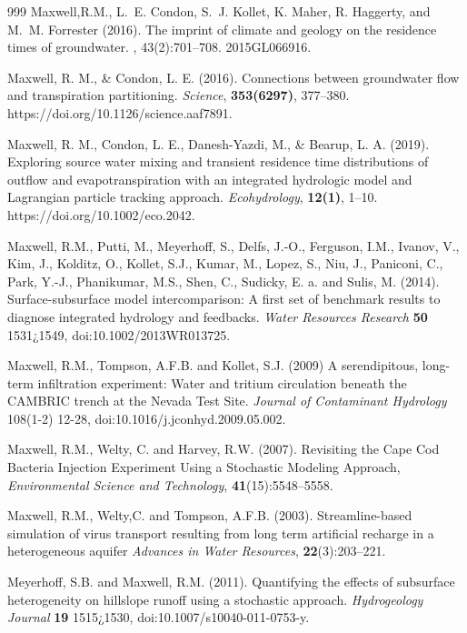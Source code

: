 \begin{thebibliography}{999}
Maxwell,R.M., L.~E. Condon, S.~J. Kollet, K. Maher, R. Haggerty, and
M.~M. Forrester (2016).
\newblock The imprint of climate and geology on the residence times of
  groundwater.
, 43(2):701--708.
\newblock 2015GL066916.


Maxwell, R. M., \& Condon, L. E. (2016). Connections between groundwater flow and transpiration partitioning. {\em Science}, {\bf 353(6297)}, 377–380. https://doi.org/10.1126/science.aaf7891.


Maxwell, R. M., Condon, L. E., Danesh-Yazdi, M., \& Bearup, L. A. (2019). Exploring source water mixing and transient residence time distributions of outflow and evapotranspiration with an integrated hydrologic model and Lagrangian particle tracking approach. {\em Ecohydrology}, {\bf 12(1)}, 1–10. https://doi.org/10.1002/eco.2042.

Maxwell, R.M., Putti, M., Meyerhoff, S., Delfs, J.-O., Ferguson, I.M., Ivanov, V., Kim, J., Kolditz, O., Kollet, S.J., Kumar, M., Lopez, S., Niu, J., Paniconi, C., Park, Y.-J., Phanikumar, M.S., Shen, C., Sudicky, E. a. and Sulis, M. (2014). Surface-subsurface model intercomparison: A first set of benchmark results to diagnose integrated hydrology and feedbacks. {\em Water Resources Research} {\bf 50} 1531¿1549, doi:10.1002/2013WR013725.

Maxwell, R.M., Tompson, A.F.B. and Kollet, S.J. (2009) A serendipitous, long-term infiltration experiment: Water and tritium circulation beneath the CAMBRIC trench at the Nevada Test Site. {\em Journal of Contaminant Hydrology} 108(1-2) 12-28, doi:10.1016/j.jconhyd.2009.05.002.

Maxwell, R.M., Welty, C. and Harvey, R.W. (2007). Revisiting the Cape Cod Bacteria Injection Experiment Using a Stochastic Modeling Approach, {\em Environmental Science and Technology}, { \bf 41}(15):5548--5558.

 Maxwell, R.M., Welty,C. and Tompson, A.F.B. (2003).
Streamline-based simulation of virus transport resulting from long term
artificial recharge in a heterogeneous aquifer {\em Advances in Water
Resources}, {\bf 22}(3):203--221.

Meyerhoff, S.B. and Maxwell, R.M. (2011). Quantifying the effects of subsurface heterogeneity on hillslope runoff using a stochastic approach. {\em Hydrogeology Journal} {\bf 19} 1515¿1530, doi:10.1007/s10040-011-0753-y.


\end{thebibliography}
